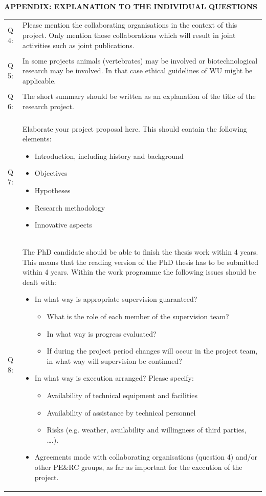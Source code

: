 \documentclass[10pt]{article}
\begin{document}
\begin{center}{\large\underline{\textbf{APPENDIX: EXPLANATION TO THE INDIVIDUAL QUESTIONS}}}\end{center}
\begin{tabularx}{\textwidth}[]{p{1.5cm}X}
Q 4: & Please mention the collaborating organisations in the context of this project. Only mention those collaborations which will result in joint activities such as joint publications.\\ \\
Q 5: & In some projects animals (vertebrates) may be involved or biotechnological research may be involved. In that case ethical guidelines of WU might be applicable.\\ \\
Q 6: & The short summary should be written as an explanation of the title of the research project.\\ \\
Q 7: & Elaborate your project proposal here. This should contain the following elements:
\begin{itemize}[nosep]
 \item Introduction, including history and background
 \item Objectives
 \item Hypotheses
 \item Research methodology
 \item Innovative aspects
\end{itemize} \\

Q 8: & The PhD candidate should be able to finish the thesis work within 4 years. This means that the reading version of the PhD thesis has to be submitted within 4 years. Within the work programme the following issues should be dealt with:
\begin{itemize}[nosep]
 \item In what way is appropriate supervision guaranteed?
 \begin{itemize}[nosep]
  \item What is the role of each member of the supervision team?
  \item In what way is progress evaluated?
  \item If during the project period changes will occur in the project team, in what way will supervision be continued?
 \end{itemize}
 \item In what way is execution arranged? Please specify:
 \begin{itemize}[nosep]
  \item Availability of technical equipment and facilities
  \item Availability of assistance by technical personnel
  \item Risks (e.g. weather, availability and willingness of third parties, ….).
 \end{itemize}
 \item Agreements made with collaborating organisations (question 4) and/or other PE\&RC groups, as far as important for the execution of the project.
\end{itemize}\\


\end{tabularx}
\end{document}

